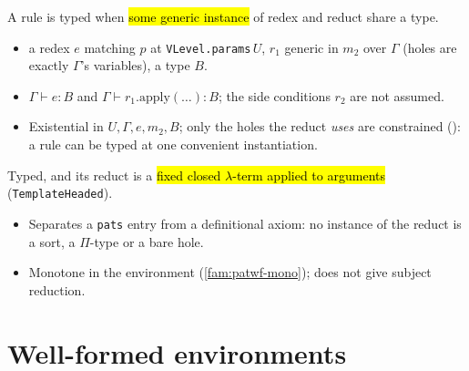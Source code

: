 \begin{definition}
\label{def:pattyped}
\leanok
{}

 A rule is typed when \hl{some generic instance} of redex and reduct share a
type.
\begin{itemize}
\item {} a redex $e$ matching $p$ at \texttt{VLevel.params}\,$U$, $r_1$ generic in
  $m_2$ over $\Gamma$ (holes are exactly $\Gamma$'s variables), a type $B$.
\item {} $\Gamma \vdash e : B$ and $\Gamma \vdash r_1.\mathrm{apply}(\ldots) : B$;
  the side conditions $r_2$ are not assumed.
\item {} Existential in $U,\Gamma,e,m_2,B$; only the holes the reduct \emph{uses}
  are constrained (): a rule can be typed
  at one convenient instantiation.
\end{itemize}
\end{definition}

\begin{definition}
\label{def:patwf}
\leanok
{}

 Typed, and its reduct is a \hl{fixed closed $\lambda$-term applied to
arguments} (\texttt{TemplateHeaded}).
\begin{itemize}
\item Separates a \texttt{pats} entry from a definitional axiom: no instance of the reduct
  is a sort, a $\Pi$-type or a bare hole.
\item Monotone in the environment (\ref{fam:patwf-mono}); does not give subject reduction.
\end{itemize}
\end{definition}

\section{Well-formed environments}

